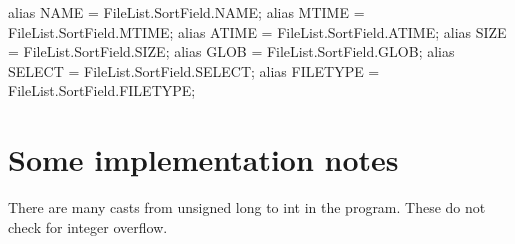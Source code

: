 alias NAME     = FileList.SortField.NAME;
alias MTIME    = FileList.SortField.MTIME;
alias ATIME    = FileList.SortField.ATIME;
alias SIZE     = FileList.SortField.SIZE;
alias GLOB     = FileList.SortField.GLOB;
alias SELECT   = FileList.SortField.SELECT;
alias FILETYPE = FileList.SortField.FILETYPE;

\nwendcode{}\section{Some implementation notes} There are many casts from
unsigned long to int in the program. These do not check for integer
overflow.
\nwenddocs{}
